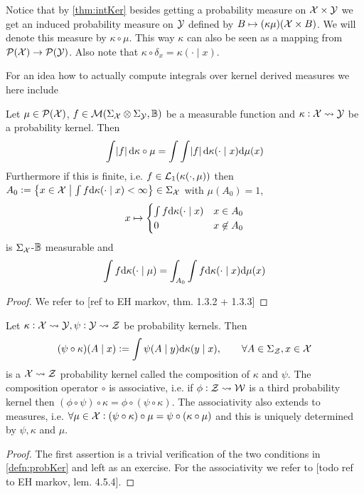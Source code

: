 Notice that by \cref{thm:intKer}
besides getting a probability measure on $\mathcal{X} \times \mathcal{Y}$
we get an induced probability measure
on $\mathcal{Y}$ defined by $B \mapsto (\kappa \mu)(\mathcal{X} \times B)$.
We will denote this measure by $\kappa \circ \mu$.
This way $\kappa$ can also be seen as a mapping from
$\mathcal{P}(\mathcal{X}) \to \mathcal{P}(\mathcal{Y})$.
Also note that $\kappa \circ \delta_x = \kappa(\cdot \mid x)$.

For an idea how to actually compute integrals over kernel derived measures
we here include
\begin{thm}
  Let $\mu \in \mathcal{P}(\mathcal{X})$,
  $f \in \mathcal{M}(\Sigma_\mathcal{X} \otimes \Sigma_\mathcal{Y}, \mathbb{B})$
  be a measurable function and
  $\kappa : \mathcal{X} \leadsto \mathcal{Y}$ be a probability kernel.
  Then
  \[ \int \abs{f} \mathrm{d} \kappa \circ \mu
  = \int \int \abs{f} \mathrm{d} \kappa(\cdot \mid x) \mathrm{d} \mu(x) \]
  Furthermore if this is finite, i.e. $f \in \mathcal{L}_1(\kappa(\cdot, \mu))$
  then $A_0 \vcentcolon= \left\{ x \in \mathcal{X} \;\middle\vert\;
    \int f \mathrm{d} \kappa(\cdot \mid x) < \infty \right\}
  \in \Sigma_\mathcal{X}$
  with $\mu(A_0) = 1$, 
  \[ x \mapsto \begin{cases}
      \int f \mathrm{d} \kappa(\cdot \mid x) & x \in A_0
      \\ 0 & x \not\in A_0
  \end{cases} \]
  is $\Sigma_\mathcal{X}$-$\mathbb{B}$ measurable and
  \[ \int f \mathrm{d} \kappa(\cdot \mid \mu)
  = \int_{A_0} \int f \mathrm{d} \kappa(\cdot \mid x) \mathrm{d} \mu(x) \]  
  \label{thm:extTonFub}
\end{thm}
\begin{proof}
  We refer to [ref to EH markov, thm. 1.3.2 + 1.3.3]
\end{proof}

\begin{prop}
  Let $\kappa : \mathcal{X} \leadsto \mathcal{Y}, \psi : \mathcal{Y} \leadsto \mathcal{Z}$
  be probability kernels. Then
  \[ (\psi \circ \kappa)(A \mid x) \vcentcolon=
    \int \psi(A \mid y) \mathrm{d} \kappa(y \mid x)
  ,\qquad \forall A \in \Sigma_{\mathcal{Z}}, x \in \mathcal{X} \]
  is a $\mathcal{X} \leadsto \mathcal{Z}$ probability kernel called the
  composition of $\kappa$ and $\psi$. The composition operator
  $\circ$ is associative, i.e. if $\phi : \mathcal{Z} \leadsto \mathcal{W}$ is
  a third probability kernel then $(\phi \circ \psi) \circ \kappa = 
  \phi \circ (\psi \circ \kappa)$.
  The associativity also extends to measures, i.e.
  $\forall \mu \in \mathcal{X}
  : (\psi \circ \kappa) \circ \mu = \psi \circ (\kappa \circ \mu) $
  and this is uniquely determined by $\psi, \kappa$ and $\mu$.
  \label{prop:compKer}
\end{prop}
\begin{proof}
  The first assertion is a trivial verification of the two conditions
  in \cref{defn:probKer} and left as an exercise.
  For the associativity we refer to [todo ref to EH markov, lem. 4.5.4].
\end{proof}

